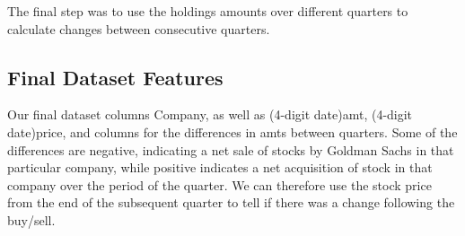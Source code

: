 \documentclass{article}
\begin{document}
\begin{multicols}{2}
The final step was to use the holdings amounts over different quarters to calculate changes between consecutive quarters.
 

\subsection*{Final Dataset Features}

Our final dataset columns Company, as well as (4-digit date)amt, (4-digit date)price, and columns for the differences in amts between quarters. Some of the differences are negative, indicating a net sale of stocks by Goldman Sachs in that particular company, while positive indicates a net acquisition of stock in that company over the period of the quarter. We can therefore use the stock price from the end of the subsequent quarter to tell if there was a change following the buy/sell.\\
\end{multicols}
\end{document}
